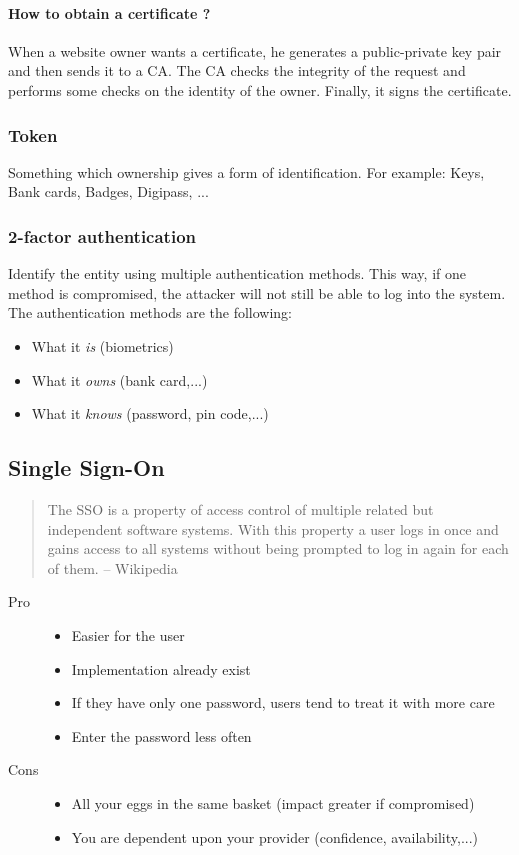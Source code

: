 \paragraph{How to obtain a certificate ?}
When a website owner wants a certificate, he generates a public-private key
pair and then sends it to a CA.
The CA checks the integrity of the request and performs some checks on the
identity of the owner. Finally, it signs the certificate.

\subsubsection{Token}
Something which ownership gives a form of identification.
For example: Keys, Bank cards, Badges, Digipass, ...

\subsubsection{2-factor authentication}
Identify the entity using multiple authentication methods.
This way, if one method is compromised, the attacker will not still be able to
log into the system.
The authentication methods are the following:
\begin{itemize}
\item What it \emph{is} (biometrics)
\item What it \emph{owns} (bank card,...)
\item What it \emph{knows} (password, pin code,...)
\end{itemize}

\subsection{Single Sign-On}
\begin{quote}
The SSO is a property of access control of multiple related but independent
software systems. With this property a user logs in once and gains access to
all systems without being prompted to log in again for each of them.
-- Wikipedia
\end{quote}

\begin{description}
\item[Pro]
\begin{itemize}
\item Easier for the user
\item Implementation already exist
\item If they have only one password, users tend to treat it with more care
\item Enter the password less often
\end{itemize}
\item[Cons]
\begin{itemize}
\item All your eggs in the same basket (impact greater if compromised)
\item You are dependent upon your provider (confidence, availability,...)
\end{itemize}
\end{description}

